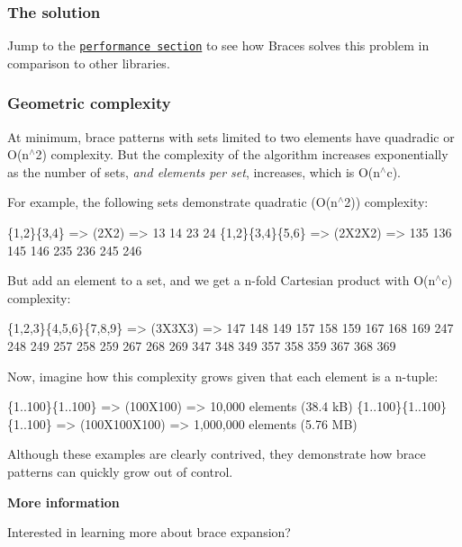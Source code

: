 \subsubsection*{The solution}

Jump to the \href{#performance}{\tt performance section} to see how Braces solves this problem in comparison to other libraries.

\subsubsection*{Geometric complexity}

At minimum, brace patterns with sets limited to two elements have quadradic or {\ttfamily O(n$^\wedge$2)} complexity. But the complexity of the algorithm increases exponentially as the number of sets, {\itshape and elements per set}, increases, which is {\ttfamily O(n$^\wedge$c)}.

For example, the following sets demonstrate quadratic ({\ttfamily O(n$^\wedge$2)}) complexity\+:


\begin{DoxyCode}
\{1,2\}\{3,4\}      => (2X2)    => 13 14 23 24
\{1,2\}\{3,4\}\{5,6\} => (2X2X2)  => 135 136 145 146 235 236 245 246
\end{DoxyCode}


But add an element to a set, and we get a n-\/fold Cartesian product with {\ttfamily O(n$^\wedge$c)} complexity\+:


\begin{DoxyCode}
\{1,2,3\}\{4,5,6\}\{7,8,9\} => (3X3X3) => 147 148 149 157 158 159 167 168 169 247 248 
                                    249 257 258 259 267 268 269 347 348 349 357 
                                    358 359 367 368 369
\end{DoxyCode}


Now, imagine how this complexity grows given that each element is a n-\/tuple\+:


\begin{DoxyCode}
\{1..100\}\{1..100\}         => (100X100)     => 10,000 elements (38.4 kB)
\{1..100\}\{1..100\}\{1..100\} => (100X100X100) => 1,000,000 elements (5.76 MB)
\end{DoxyCode}


Although these examples are clearly contrived, they demonstrate how brace patterns can quickly grow out of control.

{\bfseries More information}

Interested in learning more about brace expansion?


